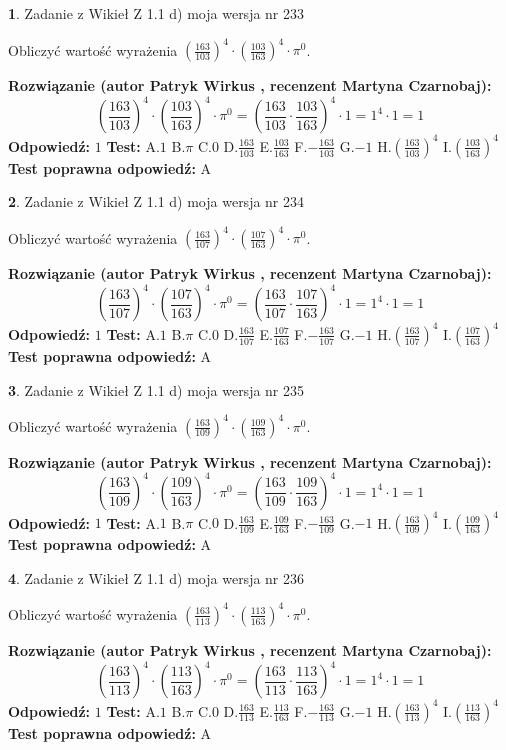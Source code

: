 \documentclass[12pt, a4paper]{article}
\theoremstyle{definition} %
\newtheorem{zad}{}
\newcommand{\zadStart}[1]{\begin{zad}#1\newline}
\newcommand{\zadStop}{\end{zad}}
\newcommand{\rozwStart}[2]{\noindent \textbf{Rozwiązanie (autor #1 , recenzent #2): }\newline}
\newcommand{\rozwStop}{\newline}
\newcommand{\odpStart}{\noindent \textbf{Odpowiedź:}\newline}
\newcommand{\odpStop}{\newline}
\newcommand{\testStart}{\noindent \textbf{Test:}\newline}
\newcommand{\testStop}{\newline}
\newcommand{\kluczStart}{\noindent \textbf{Test poprawna odpowiedź:}\newline}
\newcommand{\kluczStop}{\newline}
\begin{document}
\zadStart{Zadanie z Wikieł Z 1.1 d) moja wersja nr 233}

Obliczyć wartość wyrażenia $(\frac{163}{103})^{4} \cdot (\frac{103}{163})^{4} \cdot \pi^{0}$.
\zadStop
\rozwStart{Patryk Wirkus}{Martyna Czarnobaj}
$$(\frac{163}{103})^{4} \cdot (\frac{103}{163})^{4} \cdot \pi^{0} = (\frac{163}{103} \cdot \frac{103}{163})^{4} \cdot 1 = 1^{4} \cdot 1 = 1$$
\rozwStop
\odpStart
$1$
\odpStop
\testStart
A.$1$ B.$\pi$ C.$0$ D.$\frac{163}{103}$ E.$\frac{103}{163}$
F.$-\frac{163}{103}$ G.$-1$
H.$(\frac{163}{103})^{4}$
I.$(\frac{103}{163})^{4}$
\testStop
\kluczStart
A
\kluczStop



\zadStart{Zadanie z Wikieł Z 1.1 d) moja wersja nr 234}

Obliczyć wartość wyrażenia $(\frac{163}{107})^{4} \cdot (\frac{107}{163})^{4} \cdot \pi^{0}$.
\zadStop
\rozwStart{Patryk Wirkus}{Martyna Czarnobaj}
$$(\frac{163}{107})^{4} \cdot (\frac{107}{163})^{4} \cdot \pi^{0} = (\frac{163}{107} \cdot \frac{107}{163})^{4} \cdot 1 = 1^{4} \cdot 1 = 1$$
\rozwStop
\odpStart
$1$
\odpStop
\testStart
A.$1$ B.$\pi$ C.$0$ D.$\frac{163}{107}$ E.$\frac{107}{163}$
F.$-\frac{163}{107}$ G.$-1$
H.$(\frac{163}{107})^{4}$
I.$(\frac{107}{163})^{4}$
\testStop
\kluczStart
A
\kluczStop



\zadStart{Zadanie z Wikieł Z 1.1 d) moja wersja nr 235}

Obliczyć wartość wyrażenia $(\frac{163}{109})^{4} \cdot (\frac{109}{163})^{4} \cdot \pi^{0}$.
\zadStop
\rozwStart{Patryk Wirkus}{Martyna Czarnobaj}
$$(\frac{163}{109})^{4} \cdot (\frac{109}{163})^{4} \cdot \pi^{0} = (\frac{163}{109} \cdot \frac{109}{163})^{4} \cdot 1 = 1^{4} \cdot 1 = 1$$
\rozwStop
\odpStart
$1$
\odpStop
\testStart
A.$1$ B.$\pi$ C.$0$ D.$\frac{163}{109}$ E.$\frac{109}{163}$
F.$-\frac{163}{109}$ G.$-1$
H.$(\frac{163}{109})^{4}$
I.$(\frac{109}{163})^{4}$
\testStop
\kluczStart
A
\kluczStop



\zadStart{Zadanie z Wikieł Z 1.1 d) moja wersja nr 236}

Obliczyć wartość wyrażenia $(\frac{163}{113})^{4} \cdot (\frac{113}{163})^{4} \cdot \pi^{0}$.
\zadStop
\rozwStart{Patryk Wirkus}{Martyna Czarnobaj}
$$(\frac{163}{113})^{4} \cdot (\frac{113}{163})^{4} \cdot \pi^{0} = (\frac{163}{113} \cdot \frac{113}{163})^{4} \cdot 1 = 1^{4} \cdot 1 = 1$$
\rozwStop
\odpStart
$1$
\odpStop
\testStart
A.$1$ B.$\pi$ C.$0$ D.$\frac{163}{113}$ E.$\frac{113}{163}$
F.$-\frac{163}{113}$ G.$-1$
H.$(\frac{163}{113})^{4}$
I.$(\frac{113}{163})^{4}$
\testStop
\kluczStart
A
\kluczStop
\end{document}
